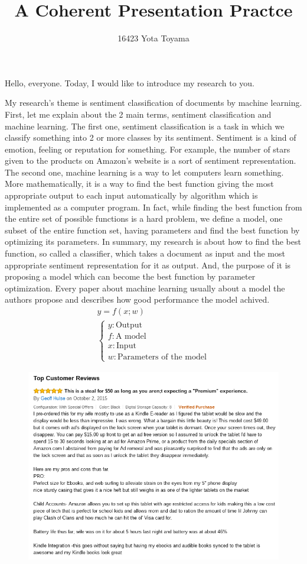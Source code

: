 \documentclass{notes}
\title{A Coherent Presentation Practce}
\author{16423 Yota Toyama}
\date{}
\begin{document}
\maketitle

Hello, everyone.
Today, I would like to introduce my research to you.

My research's theme is sentiment classification of documents
by machine learning.
First, let me explain about the 2 main terms, sentiment classification
and machine learning.
The first one, sentiment classification is a task
in which we classify something into 2 or more classes by its sentiment.
Sentiment is a kind of emotion, feeling or reputation for something.
For example, the number of stars given to the products on Amazon's website
is a sort of sentiment representation.
The second one, machine learning is a way to let computers learn something.
More mathematically, it is a way to find the best function
giving the most appropriate output to each input automatically by algorithm
which is implemented as a computer program.
In fact, while finding the best function from the entire set
of possible functions is a hard problem, we define a model,
one subset of the entire function set, having parameters
and find the best function by optimizing its parameters.
In summary, my research is about how to find the best function,
so called a classifier, which takes a document as input
and the most appropriate sentiment representation for it as output.
And, the purpose of it is proposing a model which can become the best function
by parameter optimization.
Every paper about machine learning usually about a model the authors propose
and describes how good performance the model achived.
\begin{gather*}
  y = f(x; w) \\
  \begin{cases}
    y : \text{Output} \\
    f : \text{A model} \\
    x : \text{Input} \\
    w : \text{Parameters of the model}
  \end{cases}
\end{gather*}
\begin{figure}
  \includegraphics[width=\textwidth]{fig/review.png}
\end{figure}
\end{document}
